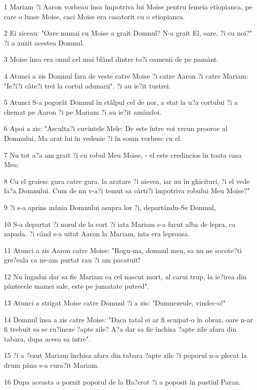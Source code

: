 \par 1 Mariam ?i Aaron vorbeau însa împotriva lui Moise pentru femeia etiopianca, pe care o luase Moise, caci Moise era casatorit cu o etiopianca.
\par 2 Ei ziceau: "Oare numai cu Moise a grait Domnul? N-a grait El, oare, ?i cu noi?" ?i a auzit acestea Domnul.
\par 3 Moise însa era omul cel mai blând dintre to?i oamenii de pe pamânt.
\par 4 Atunci a zis Domnul fara de veste catre Moise ?i catre Aaron ?i catre Mariam: "Ie?i?i câte?i trei la cortul adunarii". ?i au ie?it tustrei.
\par 5 Atunci S-a pogorât Domnul în stâlpul cel de nor, a stat la u?a cortului ?i a chemat pe Aaron ?i pe Mariam ?i au ie?it amândoi.
\par 6 Apoi a zis: "Asculta?i cuvintele Mele: De este între voi vreun prooroc al Domnului, Ma arat lui în vedenie ?i în somn vorbesc cu el.
\par 7 Nu tot a?a am grait ?i cu robul Meu Moise, - el este credincios în toata casa Mea:
\par 8 Cu el graiesc gura catre gura, la aratare ?i aievea, iar nu în ghicituri, ?i el vede fa?a Domnului. Cum de nu v-a?i temut sa cârti?i împotriva robului Meu Moise?"
\par 9 ?i s-a aprins mânia Domnului asupra lor ?i, departându-Se Domnul,
\par 10 S-a departat ?i norul de la cort ?i iata Mariam s-a facut alba de lepra, ca zapada. ?i când s-a uitat Aaron la Mariam, iata era leproasa.
\par 11 Atunci a zis Aaron catre Moise: "Rogu-ma, domnul meu, sa nu ne socote?ti gre?eala ca ne-am purtat rau ?i am pacatuit!
\par 12 Nu îngadui dar sa fie Mariam ca cel nascut mort, al carui trup, la ie?irea din pântecele mamei sale, este pe jumatate putred".
\par 13 Atunci a strigat Moise catre Domnul ?i a zis: "Dumnezeule, vindec-o!"
\par 14 Domnul însa a zis catre Moise: "Daca tatal ei ar fi scuipat-o în obraz, oare n-ar fi trebuit sa se ru?ineze ?apte zile? A?a dar sa fie închisa ?apte zile afara din tabara, dupa aceea sa intre".
\par 15 ?i a ?ezut Mariam închisa afara din tabara ?apte zile ?i poporul n-a plecat la drum pâna s-a cura?it Mariam.
\par 16 Dupa aceasta a pornit poporul de la Ha?erot ?i a poposit în pustiul Paran.

